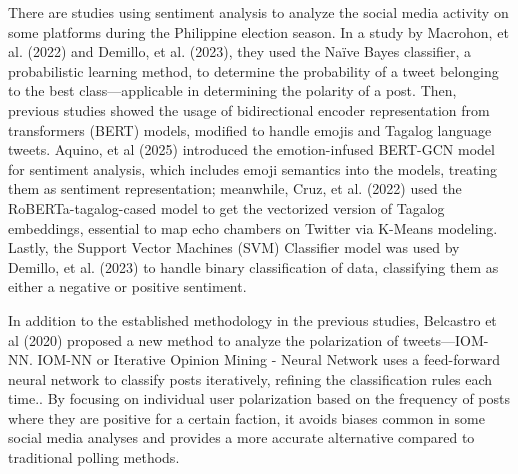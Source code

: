 There are studies using sentiment analysis to analyze the social media activity on some platforms during the Philippine election season. In a study by Macrohon, et al. (2022) and Demillo, et al. (2023), they used the Naïve Bayes classifier, a probabilistic learning method, to determine the probability of a tweet belonging to the best class—applicable in determining the polarity of a post.\cite{RRL_Macrohon-2022,RRL_Demillo-2025} Then, previous studies showed the usage of bidirectional encoder representation from transformers (BERT) models, modified to handle emojis and Tagalog language tweets. Aquino, et al (2025) introduced the emotion-infused BERT-GCN model for sentiment analysis, which includes emoji semantics into the models, treating them as sentiment representation;\cite{RRL_Aquino-2025} meanwhile, Cruz, et al. (2022) used the RoBERTa-tagalog-cased model to get the vectorized version of Tagalog embeddings, essential to map echo chambers on Twitter via K-Means modeling.\cite{RRL_Cruz-2022} Lastly, the Support Vector Machines (SVM) Classifier model was used by Demillo, et al. (2023) to handle binary classification of data, classifying them as either a negative or positive sentiment.\cite{RRL_Demillo-2025}

In addition to the established methodology in the previous studies, Belcastro et al (2020) proposed a new method to analyze the polarization of tweets—IOM-NN. IOM-NN or Iterative Opinion Mining - Neural Network uses a feed-forward neural network to classify posts iteratively, refining the classification rules each time.\cite{RRL_Belcastro-2020}. By focusing on individual user polarization based on the frequency of posts where they are positive for a certain faction, it avoids biases common in some social media analyses and provides a more accurate alternative compared to traditional polling methods.